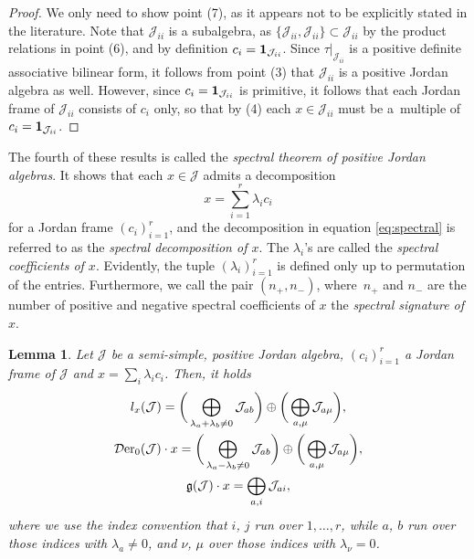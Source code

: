 \documentclass[pdftex]{sigma}
\numberwithin{equation}{section}
\newtheorem{Lemma}[Theorem]{Lemma}
\newcommand{\be}{\begin{equation}}
\newcommand{\ee}{\end{equation}}
\newcommand{\Der}{\mathcal{D}{\rm er}}
\newcommand{\Jcal}{\mathcal{J}}
\newcommand{\g}{{\mathfrak{g}}}
\begin{document}
\begin{proof}
We only need to show point (7), as it appears not to be explicitly stated in the literature.
Note that $\Jcal_{ii}$ is a subalgebra, as $\{\Jcal_{ii}, \Jcal_{ii}\} \subset \Jcal_{ii}$ by the product relations in point (6), and by definition $c_i = {\bf 1}_{\Jcal_{ii}}$.
Since $\tau|_{\Jcal_{ii}}$ is a positive definite associative bilinear form, it follows from point (3) that $\Jcal_{ii}$ is a positive Jordan algebra as well. However, since $c_i = {\bf 1}_{\Jcal_{ii}}$ is primitive, it follows that each Jordan frame of $\Jcal_{ii}$ consists of $c_i$ only, so that by (4) each $x \in \Jcal_{ii}$ must be a~multiple of $c_i = {\bf 1}_{\Jcal_{ii}}$.
\end{proof}

The fourth of these results is called the {\em spectral theorem of positive Jordan algebras}. It shows that each $x \in \Jcal$ admits a decomposition
\be \label{eq:spectral}
x = \sum_{i=1}^r \lambda_i c_i
\ee
for a Jordan frame $(c_i)_{i=1}^r$, and the decomposition in equation \eqref{eq:spectral} is referred to as the {\em spectral decomposition of $x$}.
The $\lambda_i$'s are called the {\em spectral coefficients of $x$}.
Evidently, the tuple $(\lambda_i)_{i=1}^r$ is defined only up to permutation of the entries.
Furthermore, we call the pair $(n_+, n_-)$, where~$n_+$ and $n_-$ are the number of positive and negative spectral coefficients of $x$ the {\em spectral signature of $x$}.



\begin{Lemma} \label{lem:orbits}
Let $\Jcal$ be a semi-simple, positive Jordan algebra, $(c_i)_{i=1}^r$ a Jordan frame of $\Jcal$ and $x = \sum_i \lambda_i c_i$.
Then, it holds
\begin{gather}
l_x(\Jcal) =\bigg( \bigoplus_{\lambda_a + \lambda_b \neq 0} \Jcal_{ab} \bigg)\oplus \bigg(\bigoplus_{a, \mu} \Jcal_{a\mu}\bigg),\nonumber\\
\Der_0(\Jcal) \cdot x = \bigg(\bigoplus_{\lambda_a - \lambda_b \neq 0} \Jcal_{ab}\bigg) \oplus \bigg(\bigoplus_{a, \mu} \Jcal_{a\mu}\bigg),\nonumber\\
\g(\Jcal) \cdot x = \bigoplus_{a,i} \Jcal_{ai},\label{eq:orbit-xlambda}
\end{gather}
where we use the index convention that $i$, $j$ run over $1, \dots, r$, while $a$, $b$ run over those indices with $\lambda_a \neq 0$, and $\nu$, $\mu$ over those indices with $\lambda_\nu = 0$.
\end{Lemma}
\end{document}
